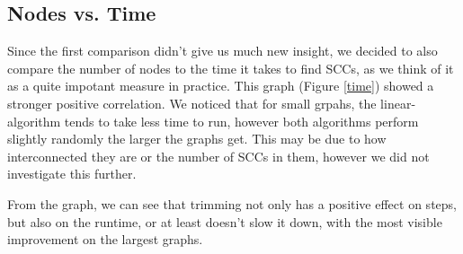 \documentclass[../master/master.tex]{subfiles}
\begin{document}
\subsection{Nodes vs. Time}
Since the first comparison didn't give us much new insight, we decided to also compare the number of nodes to the time it takes to find SCCs, as we think of it as a quite impotant measure in practice. This graph (Figure \ref{time}) showed a stronger positive correlation. We noticed that for small grpahs, the linear-algorithm tends to take less time to run, however both algorithms perform slightly randomly the larger the graphs get. This may be due to how interconnected they are or the number of SCCs in them, however we did not investigate this further.

From the graph, we can see that trimming not only has a positive effect on steps, but also on the runtime, or at least doesn't slow it down, with the most visible improvement on the largest graphs.
\end{document}
